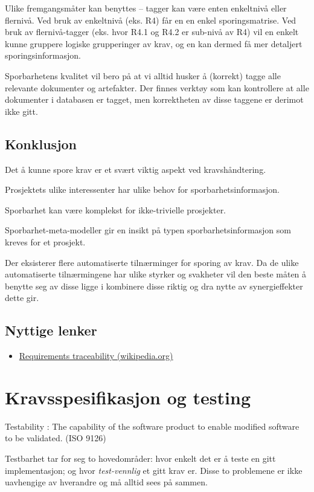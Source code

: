 Ulike fremgangsmåter kan benyttes -- tagger kan være enten enkeltnivå
eller flernivå. Ved bruk av enkeltnivå (eks. R4) får en en enkel
sporingsmatrise. Ved bruk av flernivå-tagger (eks. hvor R4.1 og R4.2 er
sub-nivå av R4) vil en enkelt kunne gruppere logiske grupperinger av
krav, og en kan dermed få mer detaljert sporingsinformasjon.

Sporbarhetens kvalitet vil bero på at vi alltid husker å (korrekt) tagge
alle relevante dokumenter og artefakter. Der finnes verktøy som kan
kontrollere at alle dokumenter i databasen er tagget, men korrektheten
av disse taggene er derimot ikke gitt.

\subsection{Konklusjon}

Det å kunne spore krav er et svært viktig aspekt ved kravshåndtering.

Prosjektets ulike interessenter har ulike behov for
sporbarhetsinformasjon.

Sporbarhet kan være komplekst for ikke-trivielle prosjekter.

Sporbarhet-meta-modeller gir en insikt på typen sporbarhetsinformasjon
som kreves for et prosjekt.

Der eksisterer flere automatiserte tilnærminger for sporing av krav. Da
de ulike automatiserte tilnærmingene har ulike styrker og svakheter vil
den beste måten å benytte seg av disse ligge i kombinere disse riktig og
dra nytte av synergieffekter dette gir.

\subsection{Nyttige lenker}

\begin{itemize}
\item
  \href{http://en.wikipedia.org/wiki/Requirements\_traceability}{Requirements
  traceability (wikipedia.org)}
\end{itemize}
\section{Kravsspesifikasjon og testing}

Testability : The capability of the software product to enable modified
software to be validated. (ISO 9126)

Testbarhet tar for seg to hovedområder: hvor enkelt det er å teste en
gitt implementasjon; og hvor \emph{test-vennlig} et gitt krav er. Disse
to problemene er ikke uavhengige av hverandre og må alltid sees på
sammen.

